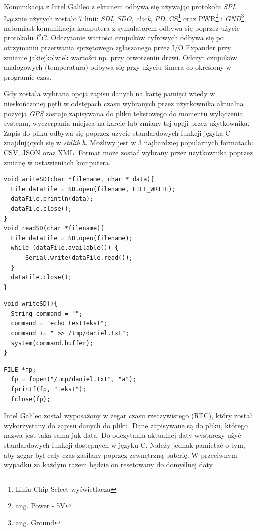 \documentclass{xmgr}
\begin{document}
Komunikacja z Intel Galileo z ekranem odbywa się używając protokołu \emph{SPI}. Łącznie użytych zostało 7 linii: \emph{SDI}, \emph{SDO}, \emph{clock}, \emph{PD}, CS\footnote{Linia Chip Select wyświetlacza} oraz PWR\footnote{ang. Power - 5V} i \emph{GND}\footnote{ang. Ground}, natomiast komunikacja komputera z symulatorem odbywa się poprzez użycie protokołu $I^2C$. Odczytanie wartości czujników cyfrowych odbywa się po otrzymaniu przerwania sprzętowego zgłaszanego przez I/O Expander przy zmianie jakiejkolwiek wartości np. przy otworzeniu drzwi. Odczyt czujników analogowych (temperatura) odbywa się przy użyciu timera co określony w programie czas. 

Gdy została wybrana opcja zapisu danych na kartę pamięci wtedy w nieskończonej pętli w odstępach czasu wybranych przez użytkownika aktualna pozycja \emph{GPS} zostaje zapisywana do pliku tekstowego do momentu wyłączenia systemu, wyczerpania miejsca na karcie lub zmiany tej opcji przez użytkownika. Zapis do pliku odbywa się poprzez użycie standardowych funkcji języka C znajdujących się w \emph{stdlib.h}. Możliwy jest w 3 najbardziej popularnych formatach: CSV, JSON oraz XML. Format może zostać wybrany przez użytkownika poprzez zmianę w ustawieniach komputera.

\begin{lstlisting}[label=bot-dirs-alg,caption=Obsługa karty microSD za pomocą mechanizmu Arduino]
void writeSD(char *filename, char * data){
  File dataFile = SD.open(filename, FILE_WRITE);
  dataFile.println(data);
  dataFile.close();
}
void readSD(char *filename){
  File dataFile = SD.open(filename);
  while (dataFile.available()) {
      Serial.write(dataFile.read());
  }
  dataFile.close();
}
\end{lstlisting}

\begin{lstlisting}[label=bot-dirs-alg,caption=Obsługa karty microSD za pomocą mechanizmu systemu operacyjnego]
void writeSD(){
  String command = "";  
  command = "echo testTekst";
  command += " >> /tmp/daniel.txt";
  system(command.buffer);
}
\end{lstlisting}

\begin{lstlisting}[label=bot-dirs-alg,caption=Obsługa karty microSD za pomocą języka C]
  FILE *fp;
  fp = fopen("/tmp/daniel.txt", "a");
  fprintf(fp, "tekst");
  fclose(fp);
\end{lstlisting}

Intel Galileo został wyposażony w zegar czasu rzeczywistego (RTC), który został wykorzystany do zapisu danych do pliku. Dane zapisywane są do pliku, którego nazwa jest taka sama jak data. Do odczytania aktualnej daty wystarczy użyć standardowych funkcji dostępnych w języku C. Należy jednak pamiętać o tym, aby zegar był cały czas zasilany poprzez zewnętrzną baterię. W przeciwnym wypadku za każdym razem będzie on resetowany do domyślnej daty.
\end{document}
